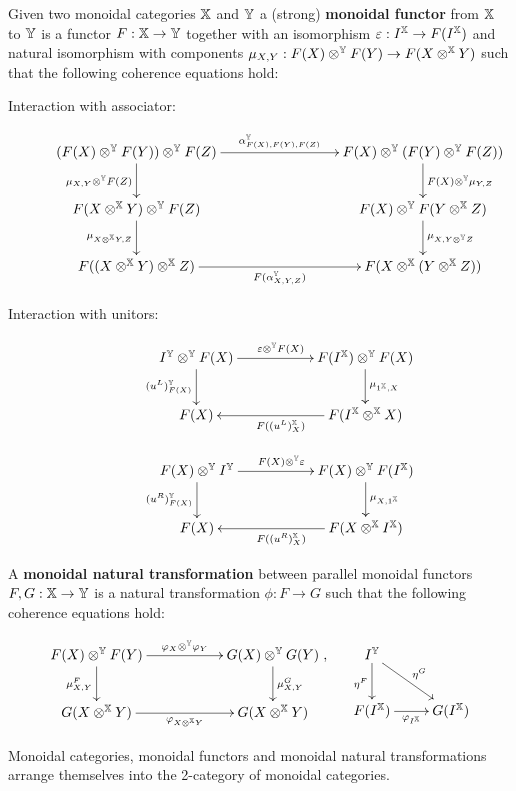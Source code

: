 \begin{definition}
Given two monoidal categories $\mathbb{X}$ and $\mathbb{Y}$ a (strong) {\bf monoidal functor} from $\mathbb{X}$ to $\mathbb{Y}$ is a functor $F:\mathbb{X}\to \mathbb{Y}$ together with an isomorphism $\varepsilon:I^{\mathbb{X}} \to F(I^{\mathbb{X}})$ and natural isomorphism with components $\mu_{X,Y}:F(X)\otimes^{\mathbb{Y}} F(Y) \to F(X \otimes^{\mathbb{X}} Y)$ such that the following coherence equations hold:

\begin{description}

\item[Interaction with associator:]

$$
\xymatrix{
 (F(X)\otimes^\Y F(Y))\otimes^\Y F(Z) \ar[rrr]^{\alpha_{F(X),F(Y),F(Z)}^{\Y}} \ar[d]_{\mu_{X,Y}\otimes^\Y F(Z)}
   &&& F(X) \otimes^\Y (F(Y)\otimes^\Y F(Z)) \ar[d]^{F(X)\otimes^\Y \mu_{Y,Z}}
 \\F(X\otimes^\X Y)\otimes^\Y F(Z) \ar[d]_{\mu_{X\otimes^\X Y,Z}}
   &&& F(X)\otimes^\Y F(Y\otimes^\X Z) \ar[d]^{\mu_{X,Y\otimes^\Y Z}}
 \\ F((X\otimes^\X Y) \otimes^\X Z) \ar[rrr]_{F(\alpha_{X,Y,Z}^\Y)}
   &&& F(X\otimes^\X (Y\otimes^\X Z))
}
$$

\item[Interaction with unitors:]
$$
\xymatrix{
 I^\Y \otimes^\Y F(X) \ar[rr]^{\epsilon \otimes^\Y F(X)} \ar[d]_{(u^L)^\Y_{F(X)}}
  &&  F(I^\X) \otimes^\Y F(X) \ar[d]^{\mu_{1^\X,X}}
\\F(X)
 & & F(I^\X\otimes^\X X) \ar[ll]^{F((u^L)^\X_{X} )}
}
$$


$$
\xymatrix{
  F(X)  \otimes^\Y I^\Y \ar[rr]^{ F(X)  \otimes^\Y \epsilon} \ar[d]_{(u^R)^\Y_{F(X)}}
  && F(X) \otimes^\Y    F(I^\X)  \ar[d]^{\mu_{X,1^\X}}
\\F(X)
 & & F(X \otimes^\X I^\X ) \ar[ll]^{F((u^R)^\X_{X} )}
}
$$
\end{description}


A {\bf monoidal natural transformation} between parallel monoidal functors $F,G:\mathbb{X}\to \mathbb{Y}$ is a natural transformation $\phi:F\to G$ such that the following coherence equations hold:

$$
\xymatrix{
  F(X)\otimes^\Y F(Y) \ar[rr]^{\phi_X\otimes^\Y \phi_Y} \ar[d]_{\mu^F_{X,Y}}
   && G(X)\otimes^\Y G(Y) \ar[d]^{\mu^G_{X,Y}}
 \\G(X\otimes^\X Y) \ar[rr]_{\phi_{X\otimes^\X Y}}
   && G(X\otimes^\X Y)
},
\hspace*{.5cm}
\xymatrix{
I^\Y \ar[dr]^{\eta^G} \ar[d]_{\eta^F}
\\ F(I^\X) \ar[r]_{\phi_{I^\X}}
  &G(I^\X)
}
$$

Monoidal categories, monoidal functors and monoidal natural transformations arrange themselves into the 2-category of monoidal categories. 
\end{definition}


